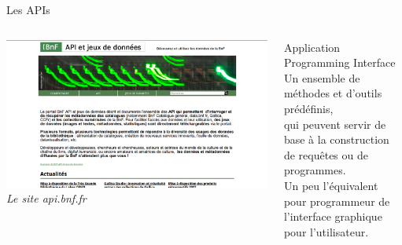 \documentclass[ignorenonframetext]{beamer}
\begin{document}
\begin{frame}{Les APIs}
	
		\begin{columns}
		\begin{column}{0.5\textwidth}
			\includegraphics[width=\textwidth]{img/API_BnF.png}
			{\footnotesize \textit{Le site api.bnf.fr}}
		\end{column}
		\begin{column}{0.50\textwidth}
			\begin{block}{Application Programming Interface}
				Un ensemble de méthodes et d'outils prédéfinis,\\
				qui peuvent servir de base à la construction de requêtes ou de programmes.\\
				
				Un peu l'équivalent pour programmeur de l'interface graphique pour l'utilisateur.
			\end{block}
		\end{column}
	\end{columns}

\end{frame}


\end{document}
